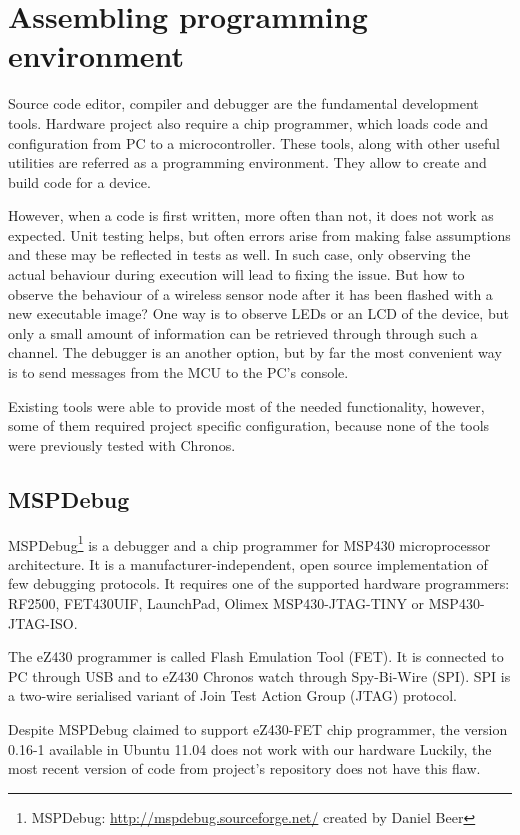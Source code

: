 \chapter{Assembling programming environment}
\label{ch:prog_env}

Source code editor, compiler and debugger are the fundamental development tools.  Hardware project also require a chip programmer, which loads code and configuration from PC to a microcontroller. These tools, along with other useful utilities are referred as a programming environment. They allow to create and build code for a device.

However, when a code is first written, more often than not, it does not work as expected. Unit testing helps, but often errors arise from making false assumptions and these may be reflected in tests as well. In such case, only observing the actual behaviour during execution will lead to fixing the issue. But how to observe the behaviour of a wireless sensor node after it has been flashed with a new executable image? One way is to observe LEDs or an LCD of the device, but only a small amount of information can be retrieved through through such a channel. The debugger is an another option, but by far the most convenient way is to send messages from the MCU to the PC's console.

Existing tools were able to provide most of the needed functionality, however, some of them required project specific configuration, because none of the tools were previously tested with Chronos.

\section{MSPDebug}
\label{ch:mspdebug}

MSPDebug\footnote{MSPDebug: \url{http://mspdebug.sourceforge.net/} created by Daniel Beer} is a debugger and a chip programmer for MSP430 microprocessor architecture.
It is a manufacturer-independent, open source implementation of few debugging protocols.
It requires one of the supported hardware programmers: RF2500, FET430UIF, LaunchPad, Olimex MSP430-JTAG-TINY or MSP430-JTAG-ISO.

The eZ430 programmer is called Flash Emulation Tool (FET).
It is connected to PC through USB and to eZ430 Chronos watch through Spy-Bi-Wire (SPI). 
SPI is a two-wire serialised variant of Join Test Action Group (JTAG) protocol.

Despite MSPDebug claimed to support eZ430-FET chip programmer, the version 0.16-1 available in Ubuntu 11.04 does not work with our hardware Luckily, the most recent version of code from project's repository does not have this flaw.

